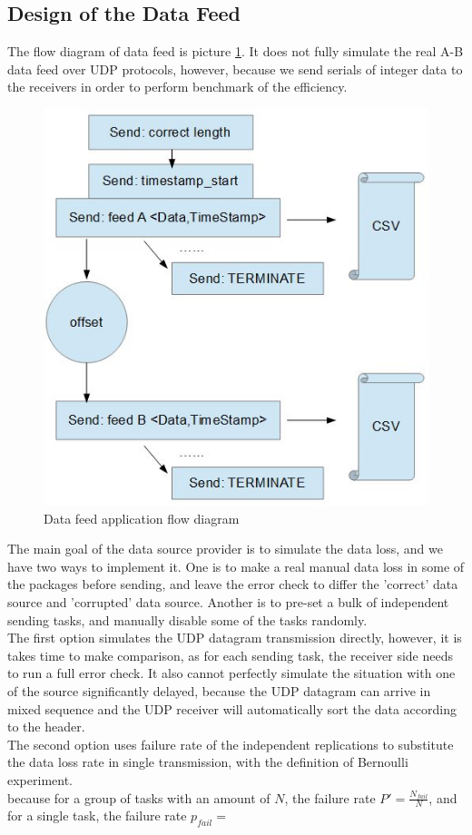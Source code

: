 \documentclass[11pt,openright,a4paper]{report}
\begin{document}
\subsection{Design of the Data Feed}
The flow diagram of data feed is picture \ref{fig:sender-diagram}. It does not fully simulate the real A-B data feed over UDP protocols, however, because we send serials of integer data to the receivers in order to perform benchmark of the efficiency. 
\begin{figure}[H]
\centering
\includegraphics[width=0.5\linewidth]{picture/sender-diagram}
\caption{Data feed application flow diagram}
\label{fig:sender-diagram}
\end{figure}
The main goal of the data source provider is to simulate the data loss, and we have two ways to implement it. One is to make a real manual data loss in some of the packages before sending, and leave the error check to differ the 'correct' data source and 'corrupted' data source. Another is to pre-set a bulk of independent sending tasks, and manually disable some of the tasks randomly.\\
The first option simulates the UDP datagram transmission directly, however, it is takes time to make comparison, as for each sending task, the receiver side needs to run a full error check. It also cannot perfectly simulate the situation with one of the source significantly delayed, because the UDP datagram can arrive in mixed sequence and the UDP receiver will automatically sort the data according to the header.\\
The second option uses failure rate of the independent replications to substitute the data loss rate in single transmission, with the definition of Bernoulli experiment\cite{anderberg2014cluster}.\\
because for a group of tasks with an amount of $N$, the failure rate ${P}'=\frac{N_{fail}}{N}$, and for a single task, the failure rate $p_{fail}=$
\end{document}
